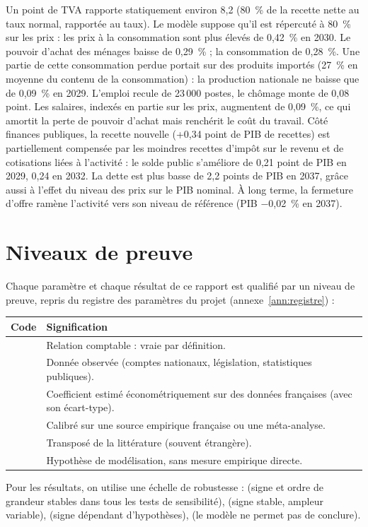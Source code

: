 \begin{exemple}
Un point de TVA rapporte statiquement environ 8,2\md{} (80~\% de la recette nette au taux normal, rapportée au taux).
Le modèle suppose qu'il est répercuté à 80~\% sur les prix : les prix à la consommation sont plus élevés de 0,42~\% en
2030. Le pouvoir d'achat des ménages baisse de 0,29~\% ; la consommation de 0,28~\%. Une partie de cette consommation
perdue portait sur des produits importés (27~\% en moyenne du contenu de la consommation) : la production nationale ne
baisse que de 0,09~\% en 2029. L'emploi recule de 23\,000 postes, le chômage monte de 0,08 point. Les
salaires, indexés en partie sur les prix, augmentent de 0,09~\%, ce qui amortit la perte de pouvoir d'achat mais
renchérit le coût du travail. Côté finances publiques, la recette nouvelle (+0,34 point de PIB de recettes) est
partiellement compensée par les moindres recettes d'impôt sur le revenu et de cotisations liées à l'activité : le
solde public s'améliore de 0,21 point de PIB en 2029, 0,24 en 2032. La dette est plus basse de 2,2 points de PIB en
2037, grâce aussi à l'effet du niveau des prix sur le PIB nominal. À long terme, la fermeture d'offre ramène l'activité
vers son niveau de référence (PIB $-$0,02~\% en 2037).
\end{exemple}

\section{Niveaux de preuve}
\label{sec:niveaux}

Chaque paramètre et chaque résultat de ce rapport est qualifié par un niveau de preuve, repris du registre des
paramètres du projet (annexe~\ref{ann:registre}) :

\begin{center}\small
\begin{tabularx}{0.95\linewidth}{@{}lL@{}}
\toprule
Code & Signification \\
\midrule
{} & Relation comptable : vraie par définition. \\
 & Donnée observée (comptes nationaux, législation, statistiques publiques). \\
 & Coefficient estimé économétriquement sur des données françaises (avec son écart-type). \\
 & Calibré sur une source empirique française ou une méta-analyse. \\
 & Transposé de la littérature (souvent étrangère). \\
 & Hypothèse de modélisation, sans mesure empirique directe. \\
\bottomrule
\end{tabularx}
\end{center}

Pour les résultats, on utilise une échelle de robustesse :  (signe et ordre de grandeur stables dans
tous les tests de sensibilité),  (signe stable, ampleur variable),  (signe
dépendant d'hypothèses),  (le modèle ne permet pas de conclure).
